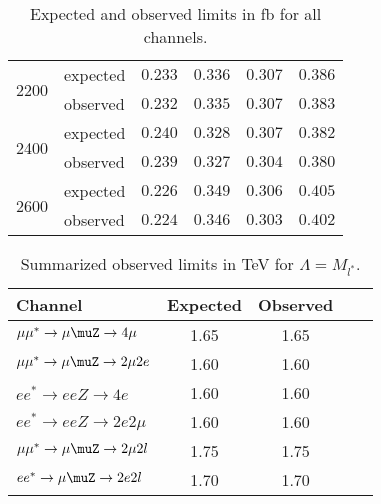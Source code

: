 \begin{table}[h!]
\begin{center}
\begin{tabular}{|l|l|c|c|c|c|}
\hline
\multirow{2}{*}{2200} & expected & $0.233$ & $0.336$ & $0.307$ & $0.386$ \\
		      & observed & $0.232$ & $0.335$ & $0.307$ & $0.383$ \\
\hline
\multirow{2}{*}{2400} & expected & $0.240$ & $0.328$ & $0.307$ & $0.382$ \\
		      & observed & $0.239$ & $0.327$ & $0.304$ & $0.380$ \\
\hline
\multirow{2}{*}{2600} & expected & $0.226$ & $0.349$ & $0.306$ & $0.405$ \\
		      & observed & $0.224$ & $0.346$ & $0.303$ & $0.402$ \\
\hline
\end{tabular}
\caption{\label{tab:comparison}Expected and observed limits in fb for all channels.}
\end{center}
\end{table}


\begin{table}[h!]
\begin{center}
\begin{tabular}{|l|c|c|c|c|}
\hline
Channel & Expected & Observed \\ 
\hline
$\mu\mu^{*} \rightarrow \mu\muZ\rightarrow 4\mu$ & 1.65 & 1.65 \\ 
$\mu\mu^{*} \rightarrow \mu\muZ\rightarrow 2\mu2e$ & 1.60 & 1.60 \\ 
$ee^{*} \rightarrow eeZ\rightarrow 4e$ & 1.60 & 1.60 \\ 
$ee^{*} \rightarrow eeZ\rightarrow 2e2\mu$ & 1.60 & 1.60 \\ 
\hline
\hline
$\mu\mu^{*} \rightarrow \mu\muZ\rightarrow 2\mu2l$ & 1.75 & 1.75 \\ 
$ee^{*} \rightarrow \mu\muZ\rightarrow 2e2l$ & 1.70 & 1.70 \\ 
\hline
\end{tabular}
\end{center}
\caption{\label{tab:results} Summarized observed limits in TeV for $\Lambda = M_{l^{*}}$.}
\end{table}

\newpage
